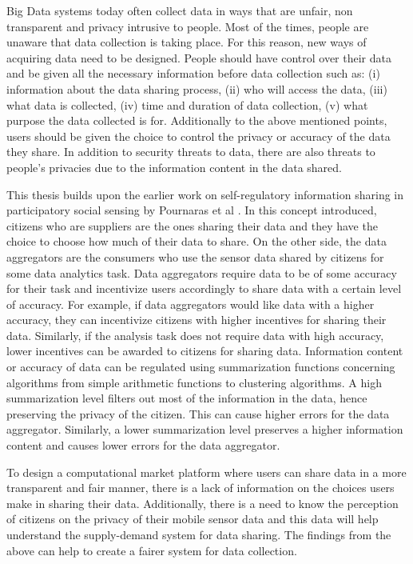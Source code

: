 Big Data systems today often collect data in ways that are unfair, non transparent and privacy intrusive to people. Most of the times, people are unaware that data collection is taking place. For this reason, new ways of acquiring data need to be designed. People should have control over their data and be given all the necessary information before data collection such as: (i) information about the data sharing process, (ii) who will access the data, (iii) what data is collected, (iv) time and duration of data collection, (v) what purpose the data collected is for. Additionally to the above mentioned points, users should be given the choice to control the privacy or accuracy of the data they share. In addition to security threats to data, there are also threats to people's privacies due to the information content in the data shared. 

This thesis builds upon the earlier work on self-regulatory information sharing in participatory social sensing by Pournaras et al \cite{pournaras2016self}. In this concept introduced, citizens who are suppliers are the ones sharing their data and they have the choice to choose how much of their data to share. On the other side, the data aggregators are the consumers who use the sensor data shared by citizens for some data analytics task. Data aggregators require data to be of some accuracy for their task and incentivize users accordingly  to share data with a certain level of accuracy. For example, if data aggregators would like data with a higher accuracy, they can incentivize citizens with higher incentives for sharing their data. Similarly, if the analysis task does not require data with high accuracy, lower incentives can be awarded to citizens for sharing data. Information content or accuracy of data can be regulated using summarization functions concerning algorithms from simple arithmetic functions to clustering algorithms. A high summarization level filters out most of the information in the data, hence preserving the privacy of the citizen. This can cause higher errors for the data aggregator. Similarly, a lower summarization level preserves a higher information content and causes lower errors for the data aggregator.

To design a computational market platform where users can share data in a more transparent and fair manner, there is a lack of information on the choices users make in sharing their data. Additionally, there is a need to know the perception of citizens on the privacy of their mobile sensor data and this data will help understand the supply-demand system for data sharing. The findings from the above can help to create a fairer system for data collection. 

